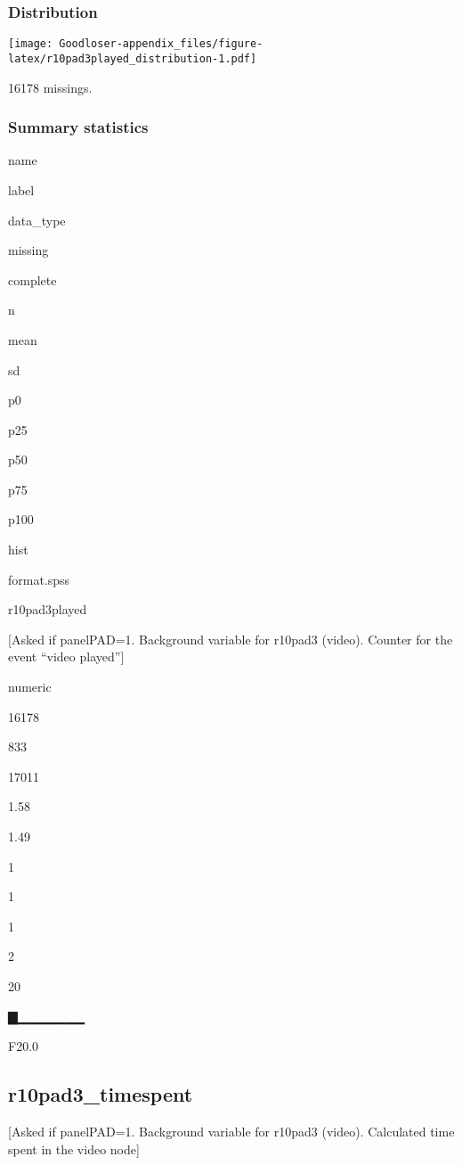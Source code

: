 \documentclass[]{book}
\begin{document}
\subsubsection{Distribution}\label{r10pad3played_distribution}

\texttt{[image: Goodloser-appendix\_files/figure-latex/r10pad3played\_distribution-1.pdf]}

16178 missings.

\subsubsection{Summary statistics}\label{r10pad3played_summary}

name

label

data\_type

missing

complete

n

mean

sd

p0

p25

p50

p75

p100

hist

format.spss

r10pad3played

{[}Asked if panelPAD=1. Background variable for r10pad3 (video). Counter
for the event ``video played''{]}

numeric

16178

833

17011

1.58

1.49

1

1

1

2

20

▇▁▁▁▁▁▁▁

F20.0

\subsection{r10pad3\_timespent}\label{r10pad3_timespent}

{[}Asked if panelPAD=1. Background variable for r10pad3 (video).
Calculated time spent in the video node{]}
\end{document}
